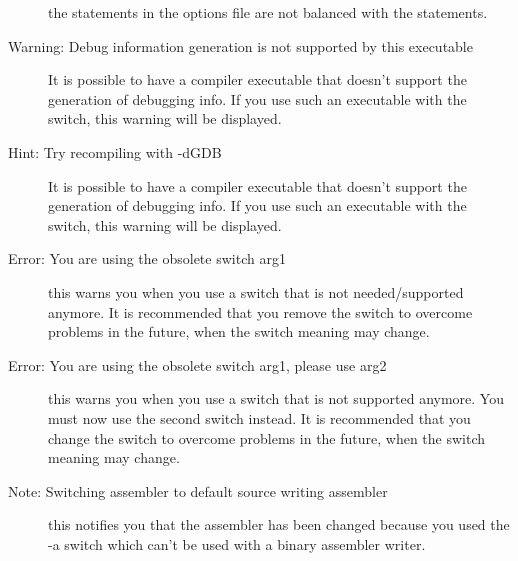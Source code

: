\begin{description}
 the  statements in the options file are not balanced with
 the  statements.
\item [Warning: Debug information generation is not supported by this executable]
 It is possible to have a compiler executable that doesn't support
 the generation of debugging info. If you use such an executable with the
  switch, this warning will be displayed.
\item [Hint: Try recompiling with -dGDB]
 It is possible to have a compiler executable that doesn't support
 the generation of debugging info. If you use such an executable with the
  switch, this warning will be displayed.
\item [Error: You are using the obsolete switch arg1]
 this warns you when you use a switch that is not needed/supported anymore.
 It is recommended that you remove the switch to overcome problems in the
 future, when the switch meaning may change.
\item [Error: You are using the obsolete switch arg1, please use arg2]
 this warns you when you use a switch that is not supported anymore. You
 must now use the second switch instead.
 It is recommended that you change the switch to overcome problems in the
 future, when the switch meaning may change.
\item [Note: Switching assembler to default source writing assembler]
 this notifies you that the assembler has been changed because you used the
 -a switch which can't be used with a binary assembler writer.
\end{description}
